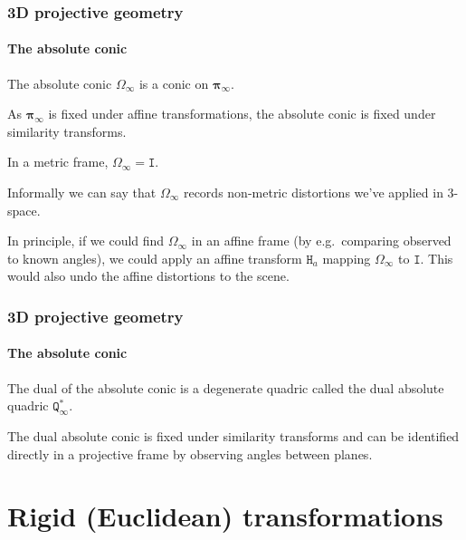 \documentclass[aspectratio=169]{beamer}
\renewcommand{\vec}[1]{\boldsymbol{#1}}
\newcommand{\mat}[1]{\mathtt{#1}}
\begin{document}
\begin{frame}
\frametitle{3D projective geometry}
\framesubtitle{The absolute conic}

The \alert{absolute conic} $\mat{\Omega}_{\infty}$ is a conic on
$\vec{\pi}_{\infty}$.

\medskip

As $\vec{\pi}_{\infty}$ is fixed under affine transformations, the
absolute conic is \alert{fixed under similarity transforms}.

\medskip

In a metric frame, $\mat{\Omega}_{\infty} = \mat{I}$.

\medskip

Informally we can say that $\mat{\Omega}_{\infty}$ records
\alert{non-metric distortions} we've applied in 3-space.

\medskip

In principle, if we could find $\mat{\Omega}_{\infty}$ in an affine
frame (by e.g.\ comparing observed to known angles), we could apply an
affine transform $\mat{H}_a$ mapping $\mat{\Omega}_{\infty}$ to
$\mat{I}$.  This would also undo the affine distortions to the scene.

\end{frame}

\begin{frame}
\frametitle{3D projective geometry}
\framesubtitle{The absolute conic}

The dual of the absolute conic is a degenerate quadric called the
\alert{dual absolute quadric} $\mat{Q}^*_{\infty}$.

\medskip

The dual absolute conic is \alert{fixed under similarity transforms}
and can be identified directly in a projective frame by observing
angles between planes.

\end{frame}

\section{Rigid (Euclidean) transformations}
\end{document}

